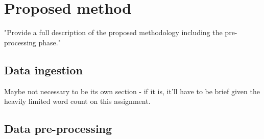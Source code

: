 \chapter{Proposed method}
"Provide a full description of the proposed
methodology including the pre-processing phase."


\section{Data ingestion}
Maybe not necessary to be its own section - if it is, it'll have to be brief given 
the heavily limited word count on this assignment.

\section{Data pre-processing}
